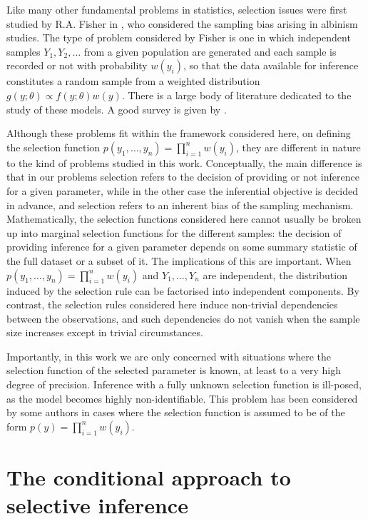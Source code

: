 \documentclass[pdflatex,sn-chicago]{sn-jnl}%
\theoremstyle{thmstyleone}%
\theoremstyle{thmstyletwo}%
\theoremstyle{thmstylethree}%
\begin{document}
Like many other fundamental problems in statistics, selection issues were first studied by R.A. Fisher in \cite{fisher34}, who considered the sampling bias arising in albinism studies. The type of problem considered by Fisher is one in which independent samples $Y_1, Y_2, \ldots$ from a given population are generated and each sample is recorded or not with probability $w(y_i)$, so that the data available for inference constitutes a random sample from a weighted distribution $ g(y;\theta) \propto f(y; \theta) w(y)$. There is a large body of literature dedicated to the study of these models. A good survey is given by \cite{rao85}. 

Although these problems fit within the framework considered here, on defining the selection function $p(y_1, \ldots, y_n) = \prod_{i = 1}^n w(y_i)$, they are different in nature to the kind of problems studied in this work. Conceptually, the main difference is that in our problems selection refers to the decision of providing or not inference for a given parameter, while in the other case the inferential objective is decided in advance, and selection refers to an inherent bias of the sampling mechanism. Mathematically, the selection functions considered here cannot usually be broken up into marginal selection functions for the different samples: the decision of providing inference for a given parameter depends on some summary statistic of the full dataset or a subset of it. The implications of this are important. When $p(y_1, \ldots, y_n) = \prod_{i = 1}^n w(y_i)$ and $Y_1, \ldots, Y_n$ are independent,  the distribution induced by the selection rule can be factorised into independent components. By contrast, the selection rules considered here induce non-trivial dependencies between the observations, and such dependencies do not vanish when the sample size increases except in trivial circumstances. 

Importantly, in this work we are only concerned with situations where the selection function of the selected parameter is known, at least to a very high degree of precision. Inference with a fully unknown selection function is ill-posed, as the  model becomes highly non-identifiable. This problem has been considered by some authors \citep[e.g.][]{bayarri-degroot} in cases where the selection function is assumed to be of the form $p(y) =\prod_{i = 1}^n w(y_i)$. 

\section{The conditional approach to selective inference}
\end{document}

